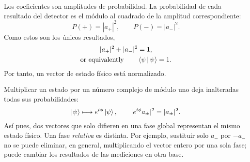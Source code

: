 Los coeficientes son amplitudes de probabilidad. La probabilidad de cada resultado del detector es el módulo al cuadrado de la amplitud correspondiente:
\begin{equation}
  P(+)=|a_+|^2,
  \qquad
  P(-)=|a_-|^2.
  \label{eq:l02-born-rule}
\end{equation}
Como estos son los únicos resultados,
\begin{equation}
  \begin{gathered}
    |a_+|^2+|a_-|^2=1,\\
    \text{or equivalently}\qquad \left\langle\psi\,\middle|\,\psi\right\rangle=1.
  \end{gathered}
  \label{eq:l02-normalization}
\end{equation}
Por tanto, un vector de estado físico está normalizado.

\begin{classroomqa}
\end{classroomqa}

Multiplicar un estado por un número complejo de módulo uno deja inalteradas todas sus probabilidades:
\begin{equation}
  \left\lvert\psi\right\rangle\longmapsto e^{i\phi}\left\lvert\psi\right\rangle,
  \qquad
  |e^{i\phi}a_\pm|^2=|a_\pm|^2.
  \label{eq:l02-global-phase}
\end{equation}
Así pues, dos vectores que solo difieren en una fase global representan el mismo estado físico. Una fase \emph{relativa} es distinta. Por ejemplo, sustituir solo \(a_-\) por \(-a_-\) no se puede eliminar, en general, multiplicando el vector entero por una sola fase; puede cambiar los resultados de las mediciones en otra base.

\begin{classroomqa}
\end{classroomqa}

